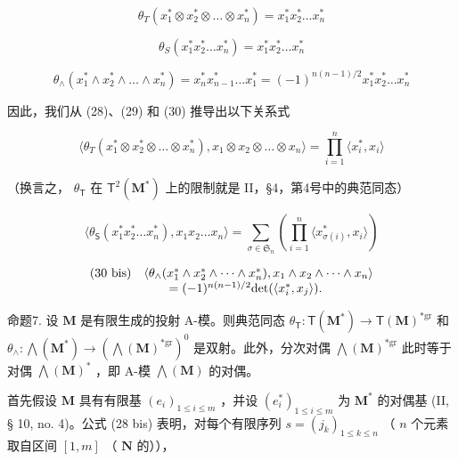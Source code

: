 \[
\theta_ {T} (x _ {1} ^ {*} \otimes x _ {2} ^ {*} \otimes \dots \otimes x _ {n} ^ {*}) = x _ {1} ^ {*} x _ {2} ^ {*} \dots x _ {n} ^ {*}
\]

\[
\theta_ {S} (x _ {1} ^ {*} x _ {2} ^ {*} \dots x _ {n} ^ {*}) = x _ {1} ^ {*} x _ {2} ^ {*} \dots x _ {n} ^ {*}
\]

\[
\theta_ {\wedge} (x _ {1} ^ {*} \wedge x _ {2} ^ {*} \wedge \dots \wedge x _ {n} ^ {*}) = x _ {n} ^ {*} x _ {n - 1} ^ {*} \dots x _ {1} ^ {*} = (- 1) ^ {n (n - 1) / 2} x _ {1} ^ {*} x _ {2} ^ {*} \dots x _ {n} ^ {*}
\]

因此，我们从 (28)、(29) 和 (30) 推导出以下关系式

\[
\langle \theta_ {T} (x _ {1} ^ {*} \otimes x _ {2} ^ {*} \otimes \dots \otimes x _ {n} ^ {*}), x _ {1} \otimes x _ {2} \otimes \dots \otimes x _ {n} \rangle = \prod_ {i = 1} ^ {n} \langle x _ {i} ^ {*}, x _ {i} \rangle\tag{28 bis}
\]

（换言之， \(\theta_{\mathsf{T}}\) 在 \(\mathsf{T}^2 (\mathbf{M}^*)\) 上的限制就是 II，§4，第4号中的典范同态）

\[
\langle \theta_ {\mathsf {S}} (x _ {1} ^ {*} x _ {2} ^ {*} \dots x _ {n} ^ {*}), x _ {1} x _ {2} \dots x _ {n} \rangle = \sum_ {\sigma \in \mathfrak {S} _ {n}} \left(\prod_ {i = 1} ^ {n} \langle x _ {\sigma (i)} ^ {*}, x _ {i} \rangle\right)\tag{29 bis}
\]

\[
\begin{array}{r l} (30 \text { bis}) &\langle \theta_ {\wedge} (x _ {1} ^ {*} \wedge x _ {2} ^ {*} \wedge \dots \wedge x _ {n} ^ {*}), x _ {1} \wedge x _ {2} \wedge \dots \wedge x _ {n} \rangle \\ & \qquad = (- 1) ^ {n (n - 1) / 2} \mathrm{det} (\langle x _ {i} ^ {*}, x _ {j} \rangle). \end{array}
\]

命题7. 设 \(\mathbf{M}\) 是有限生成的投射 A-模。则典范同态 \(\theta_{\mathsf{T}}: \mathsf{T}(\mathbf{M}^{*}) \to \mathsf{T}(\mathbf{M})^{*\mathrm{gr}}\) 和 \(\theta_{\wedge}: \bigwedge (\mathbf{M}^{*}) \to (\bigwedge (\mathbf{M})^{*\mathrm{gr}})^{0}\) 是双射。此外，分次对偶 \(\bigwedge (\mathbf{M})^{*\mathrm{gr}}\) 此时等于对偶 \(\bigwedge (\mathbf{M})^{*}\) ，即 A-模 \(\bigwedge (\mathbf{M})\) 的对偶。

首先假设 \(\mathbf{M}\) 具有有限基 \((e_i)_{1\leq i\leq m}\) ，并设 \((e_i^*)_{1\leq i\leq m}\) 为 \(\mathbf{M}^*\) 的对偶基 (II, § 10, no. 4)。公式 (28 bis) 表明，对每个有限序列 \(s = (j_k)_{1\leq k\leq n}\) （ \(n\) 个元素取自区间 \([1,m]\) （ \(\mathbf{N}\) 的）），

